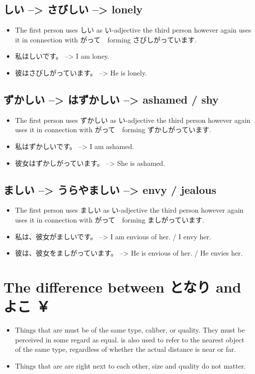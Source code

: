 \documentclass{article}
\newcommand\tabi[1][0.05cm]{\hspace*{#1}}
\begin{document}
\subsection{しい --> さびしい --> lonely }
\begin{itemize}
\item The first person uses しい as い-adjective the third person however again uses it in connection with がって　forming さびしがっています.
\item 私はしいです。 --> I am loney.
\item 彼はさびしがっています。 --> He is lonely.
\end{itemize}
\subsection{ずかしい --> はずかしい --> ashamed / shy }
\begin{itemize}
\item The first person uses ずかしい as い-adjective the third person however again uses it in connection with がって　forming ずかしがっています.
\item 私はずかしいです。 --> I am ashamed.
\item 彼女はずかしがっています。 --> She is ashamed.
\end{itemize}
\subsection{ましい --> うらやましい --> envy / jealous }
\begin{itemize}
\item The first person uses ましい as い-adjective the third person however again uses it in connection with がって　forming ましがっています.
\item 私は、彼女がましいです。 --> I am envious of her. / I envy her.
\item 彼は、彼女をましがっています。 --> He is envious of her. / He envies her.
\end{itemize}
\section{The difference between となり and よこ ￥} 
\begin{itemize}
\item Things that are  \tabi must be of the same type, caliber, or quality. They must be perceived in some regard as equal.  \tabi is also used to refer to the nearest object of the same type, regardless of whether the actual distance is near or far.
\item Things that are  \tabi are right next to each other, size and quality do not matter.
\end{itemize}
\end{document}
